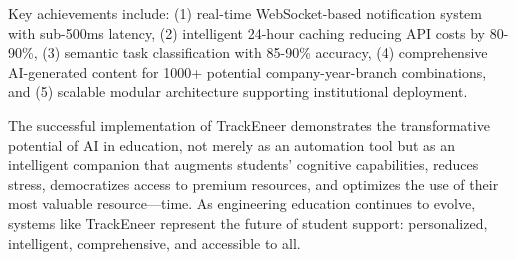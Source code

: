 \documentclass[conference]{IEEEtran}
\begin{document}
Key achievements include: (1) real-time WebSocket-based notification system with sub-500ms latency, (2) intelligent 24-hour caching reducing API costs by 80-90\%, (3) semantic task classification with 85-90\% accuracy, (4) comprehensive AI-generated content for 1000+ potential company-year-branch combinations, and (5) scalable modular architecture supporting institutional deployment.

The successful implementation of TrackEneer demonstrates the transformative potential of AI in education, not merely as an automation tool but as an intelligent companion that augments students' cognitive capabilities, reduces stress, democratizes access to premium resources, and optimizes the use of their most valuable resource—time. As engineering education continues to evolve, systems like TrackEneer represent the future of student support: personalized, intelligent, comprehensive, and accessible to all.
\end{document}
